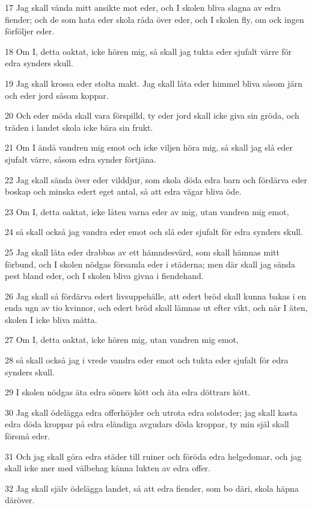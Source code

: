 \par 17 Jag skall vända mitt ansikte mot eder, och I skolen bliva slagna av edra fiender; och de som hata eder skola råda över eder, och I skolen fly, om ock ingen förföljer eder.
\par 18 Om I, detta oaktat, icke hören mig, så skall jag tukta eder sjufalt värre för edra synders skull.
\par 19 Jag skall krossa eder stolta makt. Jag skall låta eder himmel bliva såsom järn och eder jord såsom koppar.
\par 20 Och eder möda skall vara förspilld, ty eder jord skall icke giva sin gröda, och träden i landet skola icke bära sin frukt.
\par 21 Om I ändå vandren mig emot och icke viljen höra mig, så skall jag slå eder sjufalt värre, såsom edra synder förtjäna.
\par 22 Jag skall sända över eder vilddjur, som skola döda edra barn och fördärva eder boskap och minska edert eget antal, så att edra vägar bliva öde.
\par 23 Om I, detta oaktat, icke låten varna eder av mig, utan vandren mig emot,
\par 24 så skall också jag vandra eder emot och slå eder sjufalt för edra synders skull.
\par 25 Jag skall låta eder drabbas av ett hämndesvärd, som skall hämnas mitt förbund, och I skolen nödgas församla eder i städerna; men där skall jag sända pest bland eder, och I skolen bliva givna i fiendehand.
\par 26 Jag skall så fördärva edert livsuppehälle, att edert bröd skall kunna bakas i en enda ugn av tio kvinnor, och edert bröd skall lämnas ut efter vikt, och när I äten, skolen I icke bliva mätta.
\par 27 Om I, detta oaktat, icke hören mig, utan vandren mig emot,
\par 28 så skall också jag i vrede vandra eder emot och tukta eder sjufalt för edra synders skull.
\par 29 I skolen nödgas äta edra söners kött och äta edra döttrars kött.
\par 30 Jag skall ödelägga edra offerhöjder och utrota edra solstoder; jag skall kasta edra döda kroppar på edra eländiga avgudars döda kroppar, ty min själ skall försmå eder.
\par 31 Och jag skall göra edra städer till ruiner och föröda edra helgedomar, och jag skall icke mer med välbehag känna lukten av edra offer.
\par 32 Jag skall själv ödelägga landet, så att edra fiender, som bo däri, skola häpna däröver.
